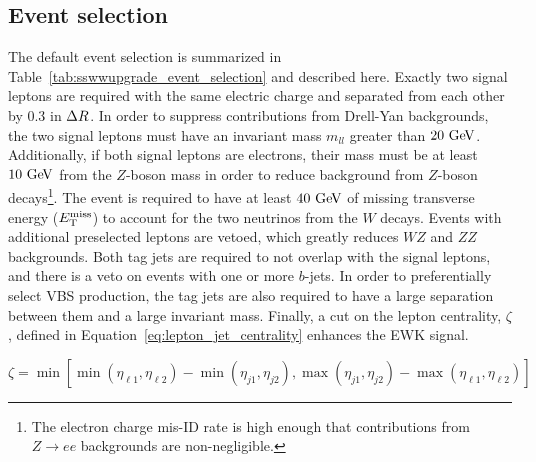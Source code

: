 \subsection{Event selection}\label{sswwupgrade:event_selection}
The default event selection is summarized in Table~\ref{tab:sswwupgrade_event_selection} and described here.
Exactly two signal leptons are required with the same electric charge and separated from each other by 0.3 in $\Delta R$.
In order to suppress contributions from Drell-Yan backgrounds, the two signal leptons must have an invariant mass $m_{ll}$ greater than $20\gev$.
Additionally, if both signal leptons are electrons, their mass must be at least $10\gev$ from the $Z$-boson mass in order to reduce background from $Z$-boson decays\footnote{The electron charge mis-ID rate is high enough that contributions from $Z\rightarrow ee$ backgrounds are non-negligible.}.
The event is required to have at least $40\gev$ of missing transverse energy ($E_{\mathrm{T}}^{\mathrm{miss}}$) to account for the two neutrinos from the $W$ decays.
Events with additional preselected leptons are vetoed, which greatly reduces $WZ$ and $ZZ$ backgrounds.
Both tag jets are required to not overlap with the signal leptons, and there is a veto on events with one or more $b$-jets.
In order to preferentially select VBS production, the tag jets are also required to have a large separation between them and a large invariant mass.
Finally, a cut on the lepton centrality, $\zeta$, defined in Equation~\ref{eq:lepton_jet_centrality} enhances the EWK \ssww signal.

\begin{equation}
\zeta = \min [\min (\eta_{\ell1}, \eta_{\ell2} )-\min(\eta_{j1},\eta_{j2}), \max(\eta_{j1},\eta_{j2})-\max(\eta_{\ell1},\eta_{\ell2}) ]
\label{eq:lepton_jet_centrality}
\end{equation}

